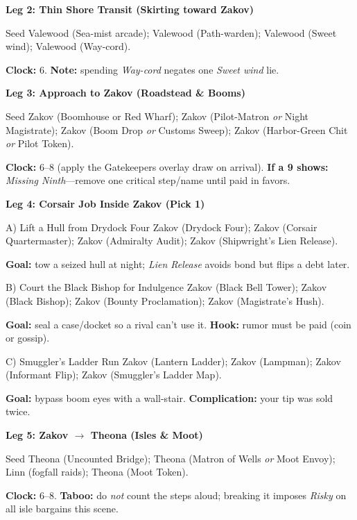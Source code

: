 \textbf{Leg 2: Thin Shore Transit (Skirting toward Zakov)}
\begin{Leg}{Seed}
Valewood \SuitSpade{} (Sea-mist arcade);
Valewood \SuitHeart{} (Path-warden);
Valewood \SuitClub{} (Sweet wind);
Valewood \SuitDiamond{} (Way-cord).
\end{Leg}
\textbf{Clock:} 6. \textbf{Note:} spending \emph{Way-cord} negates one \emph{Sweet wind} lie.

\textbf{Leg 3: Approach to Zakov (Roadstead \& Booms)}
\begin{Leg}{Seed}
Zakov \SuitSpade{} (Boomhouse or Red Wharf);
Zakov \SuitHeart{} (Pilot-Matron \emph{or} Night Magistrate);
Zakov \SuitClub{} (Boom Drop \emph{or} Customs Sweep);
Zakov \SuitDiamond{} (Harbor-Green Chit \emph{or} Pilot Token).
\end{Leg}
\textbf{Clock:} 6--8 (apply the Gatekeepers overlay draw on arrival). \textbf{If a 9 shows:} \emph{Missing Ninth}—remove one critical step/name until paid in favors.

\textbf{Leg 4: Corsair Job Inside Zakov (Pick 1)}
\begin{Leg}{A) Lift a Hull from Drydock Four}
Zakov \SuitSpade{} (Drydock Four);
Zakov \SuitHeart{} (Corsair Quartermaster);
Zakov \SuitClub{} (Admiralty Audit);
Zakov \SuitDiamond{} (Shipwright's Lien Release).
\end{Leg}
\textbf{Goal:} tow a seized hull at night; \emph{Lien Release} avoids bond but flips a debt later.

\begin{Leg}{B) Court the Black Bishop for Indulgence}
Zakov \SuitSpade{} (Black Bell Tower);
Zakov \SuitHeart{} (Black Bishop);
Zakov \SuitClub{} (Bounty Proclamation);
Zakov \SuitDiamond{} (Magistrate's Hush).
\end{Leg}
\textbf{Goal:} seal a case/docket so a rival can't use it. \textbf{Hook:} rumor must be paid (coin or gossip).

\begin{Leg}{C) Smuggler's Ladder Run}
Zakov \SuitSpade{} (Lantern Ladder);
Zakov \SuitHeart{} (Lampman);
Zakov \SuitClub{} (Informant Flip);
Zakov \SuitDiamond{} (Smuggler's Ladder Map).
\end{Leg}
\textbf{Goal:} bypass boom eyes with a wall-stair. \textbf{Complication:} your tip was sold twice.

\textbf{Leg 5: Zakov $\rightarrow$ Theona (Isles \& Moot)}
\begin{Leg}{Seed}
Theona \SuitSpade{} (Uncounted Bridge);
Theona \SuitHeart{} (Matron of Wells \emph{or} Moot Envoy);
Linn \SuitClub{} (fogfall raids);
Theona \SuitDiamond{} (Moot Token).
\end{Leg}
\textbf{Clock:} 6--8. \textbf{Taboo:} do \emph{not} count the steps aloud; breaking it imposes \emph{Risky} on all isle bargains this scene.

